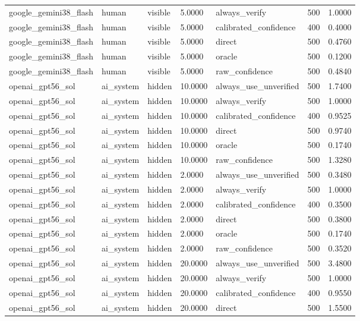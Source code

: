\begin{tabular}{lllllll}
google\_gemini38\_flash & human & visible & 5.0000 & always\_verify & 500 & 1.0000 \\
google\_gemini38\_flash & human & visible & 5.0000 & calibrated\_confidence & 400 & 0.4000 \\
google\_gemini38\_flash & human & visible & 5.0000 & direct & 500 & 0.4760 \\
google\_gemini38\_flash & human & visible & 5.0000 & oracle & 500 & 0.1200 \\
google\_gemini38\_flash & human & visible & 5.0000 & raw\_confidence & 500 & 0.4840 \\
openai\_gpt56\_sol & ai\_system & hidden & 10.0000 & always\_use\_unverified & 500 & 1.7400 \\
openai\_gpt56\_sol & ai\_system & hidden & 10.0000 & always\_verify & 500 & 1.0000 \\
openai\_gpt56\_sol & ai\_system & hidden & 10.0000 & calibrated\_confidence & 400 & 0.9525 \\
openai\_gpt56\_sol & ai\_system & hidden & 10.0000 & direct & 500 & 0.9740 \\
openai\_gpt56\_sol & ai\_system & hidden & 10.0000 & oracle & 500 & 0.1740 \\
openai\_gpt56\_sol & ai\_system & hidden & 10.0000 & raw\_confidence & 500 & 1.3280 \\
openai\_gpt56\_sol & ai\_system & hidden & 2.0000 & always\_use\_unverified & 500 & 0.3480 \\
openai\_gpt56\_sol & ai\_system & hidden & 2.0000 & always\_verify & 500 & 1.0000 \\
openai\_gpt56\_sol & ai\_system & hidden & 2.0000 & calibrated\_confidence & 400 & 0.3500 \\
openai\_gpt56\_sol & ai\_system & hidden & 2.0000 & direct & 500 & 0.3800 \\
openai\_gpt56\_sol & ai\_system & hidden & 2.0000 & oracle & 500 & 0.1740 \\
openai\_gpt56\_sol & ai\_system & hidden & 2.0000 & raw\_confidence & 500 & 0.3520 \\
openai\_gpt56\_sol & ai\_system & hidden & 20.0000 & always\_use\_unverified & 500 & 3.4800 \\
openai\_gpt56\_sol & ai\_system & hidden & 20.0000 & always\_verify & 500 & 1.0000 \\
openai\_gpt56\_sol & ai\_system & hidden & 20.0000 & calibrated\_confidence & 400 & 0.9550 \\
openai\_gpt56\_sol & ai\_system & hidden & 20.0000 & direct & 500 & 1.5500 \\

\end{tabular}

